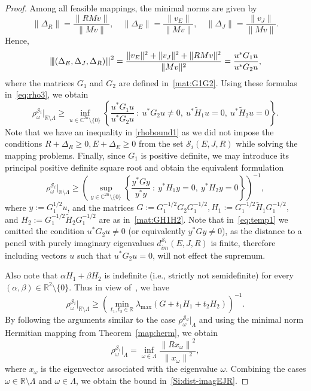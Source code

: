 \documentclass[11pt]{article}
\newcommand{\R}{\mathbb R}
\newcommand{\C}{\mathbb C}
\newcommand{\nnrm}[1]{{\left\vert\kern-0.25ex\left\vert\kern-0.25ex\left\vert #1
		\right\vert\kern-0.25ex\right\vert\kern-0.25ex\right\vert}}
\begin{document}
\begin{proof}
    Among all feasible mappings, the minimal norms are given by
    \begin{equation*}
        \|\Delta_R\| = \frac{\|R M v\|}{\|M v\|}, \quad
        \|\Delta_E\| = \frac{\|v_E\|}{\|M v\|}, \quad
        \|\Delta_J\| = \frac{\|v_J\|}{\|M v\|}.
    \end{equation*}
    Hence,
    \begin{equation*}
        \nnrm{(\Delta_E,\Delta_J,\Delta_R)}^2 = \frac{\|v_E\|^2 + \|v_J\|^2 + \|R M v\|^2}{\|M v\|^2} = \frac{u^* G_1 u}{u^* G_2 u},
    \end{equation*}
    where the matrices $G_1$ and $G_2$ are defined in~\eqref{mat:G1G2}. Using these formulas in~\eqref{eq:rho3}, we obtain
    \begin{equation}
        \rho_\omega^{\mathcal S_i}\Big|_{\R\setminus \Lambda} \geq \inf_{u\in \C^{2n}\setminus \{0\}} \left\{ \frac{u^* G_1 u}{u^* G_2 u}~:~ u^*G_2u\neq 0,~ u^*\tilde H_1u=0,~u^*\tilde H_2u=0 \right\}.\label{rhobound1}
    \end{equation}
    Note that we have an inequality in \eqref{rhobound1} as we did not impose the conditions $R+\Delta_R\geq0, E+\Delta_E\geq 0$ from the set $\mathcal S_i(E,J,R)$ while solving the mapping problems. Finally, since $G_1$ is positive definite, we may introduce its principal positive definite square root and obtain the equivalent formulation
    \begin{equation}\label{eq:temp1}
        \rho_\omega^{\mathcal S_i}\Big|_{\R\setminus \Lambda} \geq \left( \sup_{y\in \C^{2n}\setminus \{0\}} \left\{ \frac{y^* G y}{y^*y}~:~ y^*H_1y=0,~y^*H_2y=0 \right\}\right)^{-1},
    \end{equation}
    where $y:=G_1^{1/2}u$, and the matrices $G:=G_1^{-1/2}G_2G_1^{-1/2},H_1:=G_1^{-1/2}\tilde H_1G_1^{-1/2},$ and $H_2:=G_1^{-1/2}\tilde H_2G_1^{-1/2}$ are as in~\eqref{mat:GH1H2}. Note that in~\eqref{eq:temp1} we omitted the condition $u^*G_2u\neq 0$ (or equivalently $y^*Gy\neq 0$), as the distance to a pencil with purely imaginary eigenvalues $d_{im}^{\mathcal S_i}(E,J,R)$ is finite, therefore including vectors $u$ such that $u^*G_2u=0$, will not effect the supremum.

Also note that $\alpha H_1+\beta H_2$ is indefinite (i.e., strictly not semidefinite) for every $(\alpha,\beta)\in \R^2 \setminus \{0\}$. Thus in view of~\cite[Theorem 3.2]{BorKMS14}, we have
%
\[
\rho_\omega^{\mathcal S_i}\Big|_{\R\setminus \Lambda}
\geq \left(\min_{t_1,t_2 \in \R} \lambda_{\max}(G+t_1H_1+t_2H_2) \right)^{-1}.
\]
%
By following the arguments similar to the case $\rho_\omega^{\mathcal S_d}\Big|_{ \Lambda}$ and using the minimal norm Hermitian mapping from Theorem~\ref{map:herm}, we obtain
%
  \[
    \rho_\omega^{\mathcal S_i}\big|_{\Lambda} = \inf_{\omega \in \Lambda} \frac{{\|R x_\omega\|}^2}{{\|x_\omega\|}^2},
    \]
  where $x_\omega$ is the eigenvector associated with the eigenvalue $\omega$. Combining the cases $\omega\in\mathbb{R}\setminus\Lambda$ and $\omega\in\Lambda$, we obtain the bound in~\eqref{Si:dist-imagEJR}.
\end{proof}
%
\end{document}

